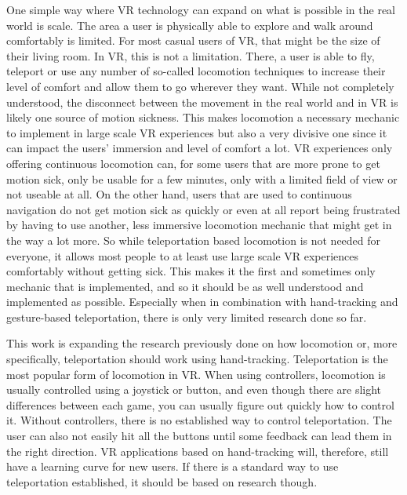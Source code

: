 One simple way where VR technology can expand on what is possible in the real world is scale. The area a user is physically able to explore and walk around comfortably is limited. For most casual users of VR, that might be the size of their living room. In VR, this is not a limitation. There, a user is able to fly, teleport or use any number of so-called locomotion techniques to increase their level of comfort and allow them to go wherever they want. While not completely understood, the disconnect between the movement in the real world and in VR is likely one source of motion sickness. This makes locomotion a necessary mechanic to implement in large scale VR experiences but also a very divisive one since it can impact the users' immersion and level of comfort a lot. VR experiences only offering continuous locomotion can, for some users that are more prone to get motion sick, only be usable for a few minutes, only with a limited field of view or not useable at all. On the other hand, users that are used to continuous navigation do not get motion sick as quickly or even at all report being frustrated by having to use another, less immersive locomotion mechanic that might get in the way a lot more. So while teleportation based locomotion is not needed for everyone, it allows most people to at least use large scale VR experiences comfortably without getting sick. This makes it the first and sometimes only mechanic that is implemented, and so it should be as well understood and implemented as possible. Especially when in combination with hand-tracking and gesture-based teleportation, there is only very limited research done so far.

This work is expanding the research previously done on how locomotion or, more specifically, teleportation should work using hand-tracking. Teleportation is the most popular form of locomotion in VR. When using controllers, locomotion is usually controlled using a joystick or button, and even though there are slight differences between each game, you can usually figure out quickly how to control it. Without controllers, there is no established way to control teleportation. The user can also not easily hit all the buttons until some feedback can lead them in the right direction. VR applications based on hand-tracking will, therefore, still have a learning curve for new users. If there is a standard way to use teleportation established, it should be based on research though. 






